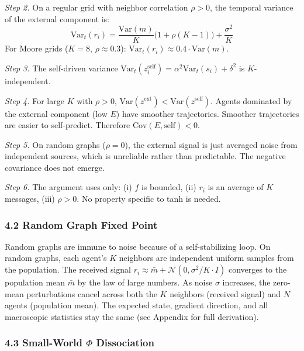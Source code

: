 \documentclass[
  11pt,
]{article}
\begin{document}
\emph{Step 2.} On a regular grid with neighbor correlation \(\rho > 0\),
the temporal variance of the external component is:
\[\text{Var}_t(r_i) = \frac{\text{Var}(m)}{K}\big(1 + \rho(K-1)\big) + \frac{\sigma^2}{K}\]
For Moore grids (\(K = 8\), \(\rho \approx 0.3\)):
\(\text{Var}_t(r_i) \approx 0.4 \cdot \text{Var}(m)\).

\emph{Step 3.} The self-driven variance
\(\text{Var}_t(z_i^{\text{self}}) = \alpha^2 \text{Var}_t(s_i) + \delta^2\)
is \(K\)-independent.

\emph{Step 4.} For large \(K\) with \(\rho > 0\),
\(\text{Var}(z^{\text{ext}}) < \text{Var}(z^{\text{self}})\). Agents
dominated by the external component (low \(E\)) have smoother
trajectories. Smoother trajectories are easier to self-predict.
Therefore \(\text{Cov}(E, \text{self}) < 0\).

\emph{Step 5.} On random graphs (\(\rho = 0\)), the external signal is
just averaged noise from independent sources, which is unreliable rather
than predictable. The negative covariance does not emerge.

\emph{Step 6.} The argument uses only: (i) \(f\) is bounded, (ii)
\(r_i\) is an average of \(K\) messages, (iii) \(\rho > 0\). No property
specific to tanh is needed.

\subsubsection{4.2 Random Graph Fixed
Point}\label{random-graph-fixed-point}

Random graphs are immune to noise because of a self-stabilizing loop. On
random graphs, each agent's \(K\) neighbors are independent uniform
samples from the population. The received signal
\(r_i \approx \bar{m} + \mathcal{N}(0, \sigma^2/K \cdot I)\) converges
to the population mean \(\bar{m}\) by the law of large numbers. As noise
\(\sigma\) increases, the zero-mean perturbations cancel across both the
\(K\) neighbors (received signal) and \(N\) agents (population mean).
The expected state, gradient direction, and all macroscopic statistics
stay the same (see Appendix for full derivation).

\subsubsection{\texorpdfstring{4.3 Small-World \(\Phi\)
Dissociation}{4.3 Small-World \textbackslash Phi Dissociation}}\label{small-world-phi-dissociation}
\end{document}

